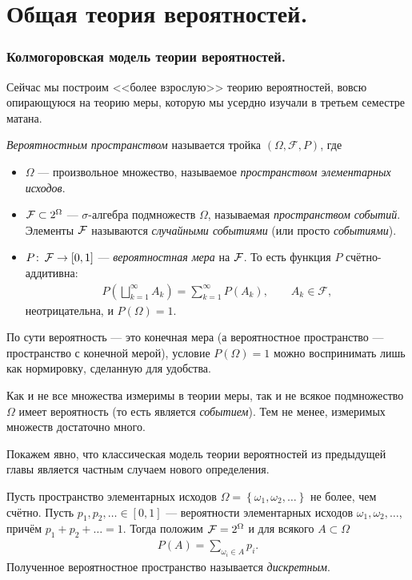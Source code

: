\documentclass[../main.tex]{subfiles}
\begin{document}
\newpage
\part{Общая теория вероятностей.}
\section{Колмогоровская модель теории вероятностей.}

Сейчас мы построим <<более взрослую>> теорию вероятностей, вовсю опирающуюся на теорию меры, которую мы усердно изучали в третьем семестре матана.

\begin{df}
 \textit{Вероятностным пространством} называется тройка $(\Omega, \mathcal F, P)$, где
 \begin{itemize}
  \item $\Omega$ --- произвольное множество, называемое \textit{пространством элементарных исходов}.
  \item $\mathcal F \subset 2^{\Omega}$ --- $\sigma$-алгебра подмножеств $\Omega$, называемая \textit{пространством событий}. Элементы $\mathcal F$ называются \textit{случайными событиями} (или просто \textit{событиями}).
  \item $P \colon\, \mathcal F \to [0,1]$ --- \textit{вероятностная мера} на $\mathcal F$. То есть функция $P$ счётно-аддитивна:
   \begin{align*}
    P \left( \bigsqcup_{k=1}^{\infty}A_k \right) = \sum_{k=1}^{\infty}P(A_k), \qquad A_k \in \mathcal F,
   \end{align*} неотрицательна, и $P(\Omega) = 1$.
 \end{itemize}
\end{df}

По сути вероятность --- это конечная мера (а вероятностное пространство --- пространство с конечной мерой), условие $ P(\Omega) = 1 $ можно воспринимать лишь как нормировку, сделанную для удобства.

Как и не все множества измеримы в теории меры, так и не всякое подмножество $ \Omega $ имеет вероятность (то есть является \textit{событием}). Тем не менее, измеримых множеств достаточно много.

Покажем явно, что классическая модель теории вероятностей из предыдущей главы является частным случаем нового определения.

\begin{exmpl}
 Пусть пространство элементарных исходов $\Omega = \left\{ \omega_1, \omega_2, \ldots \right\}$ не более, чем счётно. Пусть $p_1, p_2, \ldots \in [0,1]$ --- вероятности элементарных исходов $\omega_1, \omega_2, \ldots$, причём $p_1 + p_2 + \ldots  = 1$. Тогда положим $\mathcal F = 2^{\Omega}$ и для всякого $A \subset \Omega$
 \begin{align*}
  P(A) = \sum_{\omega_i \in A} p_i.
 \end{align*} Полученное вероятностное пространство называется \textit{дискретным}.
\end{exmpl}
\end{document}
